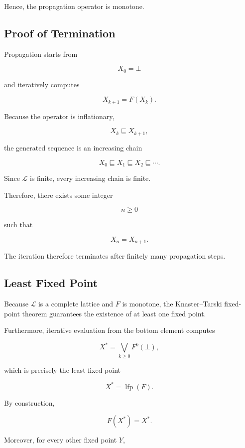 \documentclass[10pt]{article}
\begin{document}
Hence, the propagation operator is monotone.


\subsection{Proof of Termination}

Propagation starts from

\[
X_0=\bot
\]

and iteratively computes

\[
X_{k+1}=F(X_k).
\]

Because the operator is inflationary,

\[
X_k
\sqsubseteq
X_{k+1},
\]

the generated sequence is an increasing chain

\[
X_0
\sqsubseteq
X_1
\sqsubseteq
X_2
\sqsubseteq
\cdots.
\]

Since $\mathcal{L}$ is finite, every increasing chain is finite.

Therefore, there exists some integer

\[
n\geq0
\]

such that

\[
X_n=X_{n+1}.
\]

The iteration therefore terminates after finitely many propagation steps.


\subsection{Least Fixed Point}

Because $\mathcal{L}$ is a complete lattice and $F$ is monotone, the
Knaster--Tarski fixed-point theorem guarantees the existence of at least one
fixed point.

Furthermore, iterative evaluation from the bottom element computes

\[
X^\ast
=
\bigvee_{k\ge0}
F^k(\bot),
\]

which is precisely the least fixed point

\[
X^\ast
=
\operatorname{lfp}(F).
\]

By construction,

\[
F(X^\ast)=X^\ast.
\]

Moreover, for every other fixed point $Y$,
\end{document}
